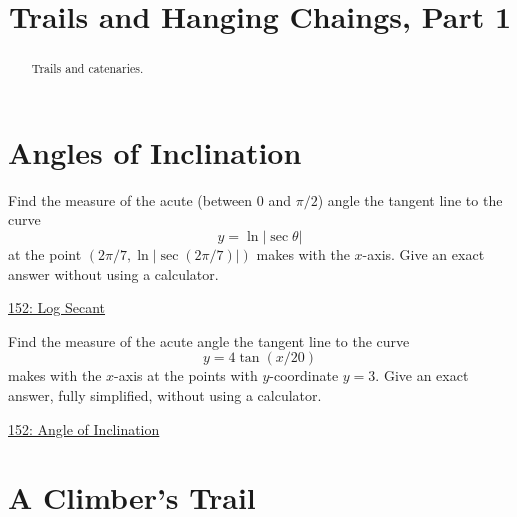 \documentclass{ximera}
\title{Trails and Hanging Chaings, Part 1}
\begin{document}
\begin{abstract}
Trails and catenaries.
\end{abstract}
\maketitle


\section{Angles of Inclination}

\begin{question}  \label{QPdiftgerdf}
Find the measure of the acute (between $0$ and $\pi/2$) angle the tangent line to the curve
\[
     y = \ln | \sec \theta|
\]
at the point $(2\pi/7, \ln |\sec (2\pi/7)|)$ makes with the $x$-axis. Give an exact answer without using a calculator.



\begin{onlineOnly}
    \begin{center}
\end{center}
\end{onlineOnly}

\href{https://www.desmos.com/calculator/yyyj3pjmk2}{152: Log Secant}
\end{question}


\begin{question}  \label{QJKDF3erdfsmdf}
Find the measure of the acute angle the tangent line to the curve
\[
    y = 4 \tan(x/20)
\]
makes with the $x$-axis at the points with $y$-coordinate $y=3$. Give an exact answer, fully simplified, without using a calculator.

\begin{onlineOnly}
    \begin{center}
\end{center}
\end{onlineOnly}

\href{https://www.desmos.com/calculator/df7hjgabzb}{152: Angle of Inclination}
\end{question}



\section{A Climber's Trail}
\end{document}
